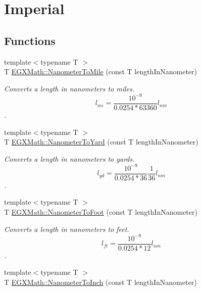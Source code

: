 \hypertarget{group___e_g_x_math-_conversions-_length_conversions-_s_i-_nanometer-_imperial}{}\section{Imperial}
\label{group___e_g_x_math-_conversions-_length_conversions-_s_i-_nanometer-_imperial}
\subsection*{Functions}
\begin{DoxyCompactItemize}
\item 
{\footnotesize template$<$typename T $>$ }\\T \mbox{\hyperlink{group___e_g_x_math-_conversions-_length_conversions-_s_i-_nanometer-_imperial_gadbf1e269e14b8afcd128aa5534f28a5e}{E\+G\+X\+Math\+::\+Nanometer\+To\+Mile}} (const T length\+In\+Nanometer)
\begin{DoxyCompactList}\small\item\em Converts a length in nanometers to miles. \[ l_{mi}=\frac{10^{-9}}{0.0254 * 63360} l_{nm} \]. \end{DoxyCompactList}\item 
{\footnotesize template$<$typename T $>$ }\\T \mbox{\hyperlink{group___e_g_x_math-_conversions-_length_conversions-_s_i-_nanometer-_imperial_ga1f2313a0bf1527690778a6dace0db853}{E\+G\+X\+Math\+::\+Nanometer\+To\+Yard}} (const T length\+In\+Nanometer)
\begin{DoxyCompactList}\small\item\em Converts a length in nanometers to yards. \[ l_{yd}= \frac{10^{-9}}{0.0254 * 36} \frac{1}{36} l_{nm} \]. \end{DoxyCompactList}\item 
{\footnotesize template$<$typename T $>$ }\\T \mbox{\hyperlink{group___e_g_x_math-_conversions-_length_conversions-_s_i-_nanometer-_imperial_ga7c6124e07aa11d37695c96c5a520197d}{E\+G\+X\+Math\+::\+Nanometer\+To\+Foot}} (const T length\+In\+Nanometer)
\begin{DoxyCompactList}\small\item\em Converts a length in nanometers to feet. \[ l_{ft}= \frac{10^{-9}}{0.0254 * 12} l_{nm} \]. \end{DoxyCompactList}\item 
{\footnotesize template$<$typename T $>$ }\\T \mbox{\hyperlink{group___e_g_x_math-_conversions-_length_conversions-_s_i-_nanometer-_imperial_ga8b72dde5616da5be31e8054f1facc501}{E\+G\+X\+Math\+::\+Nanometer\+To\+Inch}} (const T length\+In\+Nanometer)

\end{DoxyCompactItemize}

